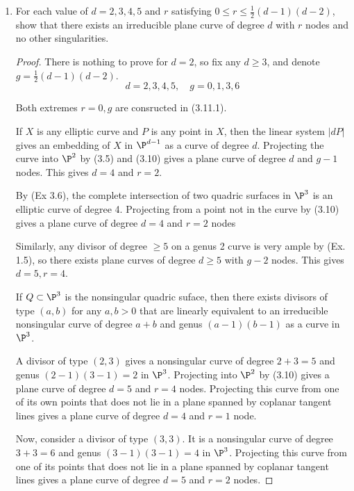 \documentclass[a4paper]{article}
\begin{document}
\begin{enumerate} [label=\textbf{\arabic*.}, leftmargin=0em]
  \item[\textbf{12.}] For each value of $d = 2, 3, 4, 5$ and $r$ satisfying $0 \leq r \leq \frac{1}{2}(d - 1)(d - 2)$, show that there exists an irreducible plane curve of degree $d$ with $r$ nodes and no other singularities.

        \begin{proof}
          There is nothing to prove for $d = 2$, so fix any $d \geq 3$, and denote $g = \frac{1}{2}(d - 1)(d - 2)$.
          \begin{equation*}
            d = 2, 3, 4, 5, \quad g = 0, 1, 3, 6
          \end{equation*}

          Both extremes $r = 0, g$ are consructed in (3.11.1).

          If $X$ is any elliptic curve and $P$ is any point in $X$, then the linear system $|dP|$ gives an embedding of $X$ in $\P^{d - 1}$ as a curve of degree $d$.
          Projecting the curve into $\P^2$ by (3.5) and (3.10) gives a plane curve of degree $d$ and $g - 1$ nodes.
          This gives $d = 4$ and $r = 2$.

          By (Ex 3.6), the complete intersection of two quadric surfaces in $\P^3$ is an elliptic curve of degree 4.
          Projecting from a point not in the curve by (3.10) gives a plane curve of degree $d = 4$ and $r = 2$ nodes

          Similarly, any divisor of degree $\geq 5$ on a genus 2 curve is very ample by (Ex. 1.5), so there exists plane curves of degree $d \geq 5$ with $g - 2$ nodes.
          This gives $d = 5, r = 4$.

          If $Q \subset \P^3$ is the nonsingular quadric suface, then there exists divisors of type $(a, b)$ for any $a, b > 0$ that are linearly equivalent to an irreducible nonsingular curve of degree $a + b$ and genus $(a - 1)(b - 1)$ as a curve in $\P^3$.

          A divisor of type $(2, 3)$ gives a nonsingular curve of degree $2 + 3 = 5$ and genus $(2 - 1)(3 - 1) = 2$ in $\P^3$.
          Projecting into $\P^2$ by (3.10) gives a plane curve of degree $d = 5$ and $r = 4$ nodes.
          Projecting this curve from one of its own points that does not lie in a plane spanned by coplanar tangent lines gives a plane curve of degree $d = 4$ and $r = 1$ node.

          Now, consider a divisor of type $(3, 3)$.
          It is a nonsingular curve of degree $3 + 3 = 6$ and genus $(3 - 1)(3 - 1) = 4$ in $\P^3$.
          Projecting this curve from one of its points that does not lie in a plane spanned by coplanar tangent lines gives a plane curve of degree $d = 5$ and $r = 2$ nodes.


\end{proof}
\end{enumerate}
\end{document}
